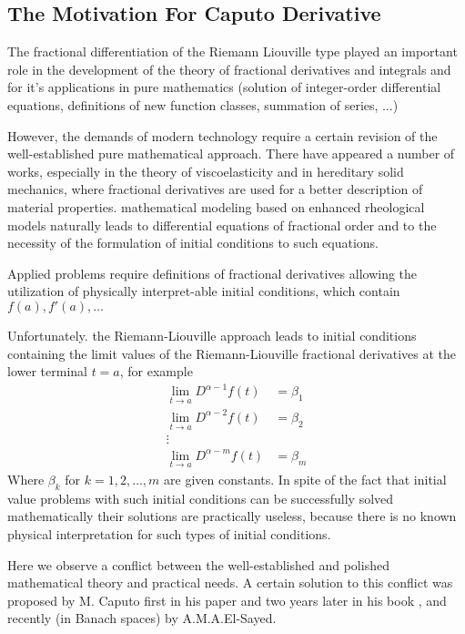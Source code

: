 \subsection{The Motivation For Caputo Derivative}
The fractional differentiation of the Riemann Liouville type played an 
important role in the development of the theory of fractional derivatives 
and integrals and for it's applications in pure mathematics (solution of integer-order differential equations,
definitions of new function classes, summation of series, $\dots$)

However, the demands of modern technology require a certain revision of the 
well-established pure mathematical approach. There have appeared a number of works, 
especially in the theory of viscoelasticity and in hereditary solid mechanics, 
where fractional derivatives are used for a better description of material properties. 
mathematical modeling based on enhanced rheological models naturally leads to differential equations
of fractional order and to the necessity of the formulation of initial conditions to such equations.

Applied problems require definitions of fractional derivatives allowing
the utilization of physically interpret-able initial conditions, which contain
$f(a), f'(a),\dots$

Unfortunately. the Riemann-Liouville approach leads to initial conditions 
containing the limit values of the Riemann-Liouville fractional
derivatives at the lower terminal $t=a$, for example
\begin{align*}
    \lim_{t \to a } D^{\alpha-1} f(t) &= \beta_1
    \\
    \lim_{t \to a } D^{\alpha-2} f(t) &= \beta_2
    \\
    \vdots
    \\
    \lim_{t \to a } D^{\alpha-m} f(t) &= \beta_m
\end{align*}
Where $\beta_k$ for $k = 1,2,\dots,m$ are given constants.
In spite of the fact that initial value problems with such initial conditions 
can be successfully solved mathematically their solutions are practically
useless, because there is no known physical interpretation for such types
of initial conditions.

Here we observe a conflict between the well-established and polished
mathematical theory and practical needs.
A certain solution to this conflict was proposed by M. Caputo first
in his paper and two years later in his book , and recently (in
Banach spaces) by \textcolor{theme}{A.M.A.El-Sayed}.

